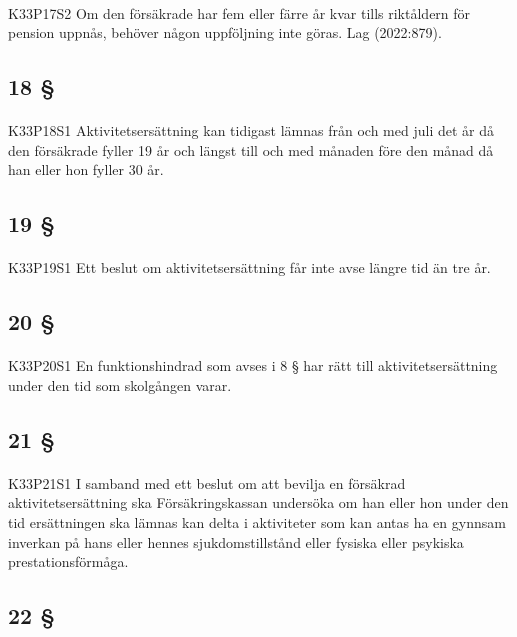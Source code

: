 \documentclass[a4paper,notitlepage,openany,10pt]{book}
\begin{document}
\paragraph*{}
{\tiny K33P17S2}
Om den försäkrade har fem eller färre år kvar tills riktåldern för pension uppnås, behöver någon uppföljning inte göras.
Lag (2022:879).
\subsection*{18 §}
\paragraph*{}
{\tiny K33P18S1}
Aktivitetsersättning kan tidigast lämnas från och med juli det år då den försäkrade fyller 19 år och längst till och med månaden före den månad då han eller hon fyller 30 år.
\subsection*{19 §}
\paragraph*{}
{\tiny K33P19S1}
Ett beslut om aktivitetsersättning får inte avse längre tid än tre år.
\subsection*{20 §}
\paragraph*{}
{\tiny K33P20S1}
En funktionshindrad som avses i 8 § har rätt till aktivitetsersättning under den tid som skolgången varar.
\subsection*{21 §}
\paragraph*{}
{\tiny K33P21S1}
I samband med ett beslut om att bevilja en försäkrad aktivitetsersättning ska Försäkringskassan undersöka om han eller hon under den tid ersättningen ska lämnas kan delta i aktiviteter som kan antas ha en gynnsam inverkan på hans eller hennes sjukdomstillstånd eller fysiska eller psykiska prestationsförmåga.
\subsection*{22 §}
\end{document}
